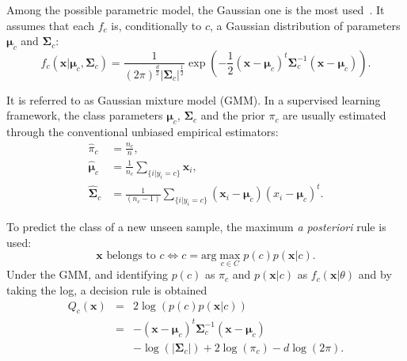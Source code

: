 \documentclass[journal,peerreview,onecolumn]{IEEEtran}
\begin{document}
    Among the possible parametric model,  the Gaussian one is the most
    used~\cite{bouveyron2014model}.   It assumes  that each  $f_c$ is,
    conditionally  to  $c$,  a  Gaussian  distribution  of  parameters
    $\boldsymbol{\mu}_c$    and    $\boldsymbol{\Sigma}_c$:
    \begin{equation*}
        f_c(\mathbf{x}|\boldsymbol{\mu}_c, \boldsymbol{\Sigma}_c) = \frac{1}{(2\pi)^{\frac{d}{2}} |\boldsymbol{\Sigma}_c|^{\frac{1}{2}}} \exp \left( -\frac{1}{2} (\mathbf{x} - \boldsymbol{\mu}_c)^t \boldsymbol{\Sigma}_c^{-1} (\mathbf{x} - \boldsymbol{\mu}_c) \right).
    \end{equation*}

    It  is  referred  to  as  Gaussian  mixture  model  (GMM).   In  a
    supervised    learning    framework,    the    class    parameters
    $\boldsymbol{\mu}_c$,   $\boldsymbol{\Sigma}_c$   and  the   prior
    $\pi_c$ are  usually estimated  through the  conventional unbiased
    empirical estimators:
    \begin{align}
        \hat{\pi}_c &= \frac{n_c}{n},\\
        \hat{\boldsymbol{\mu}}_c &= \frac{1}{n_c} \sum_{\{i|y_i = c\}} \mathbf{x}_i ,\\
        \hat{\boldsymbol{\Sigma}}_c &= \frac{1}{(n_c - 1)} \sum_{\{i|y_i = c\}} (\mathbf{x}_i - \boldsymbol{\mu}_c) (\boldsymbol{}x_i - \boldsymbol{\mu}_c)^t.
    \end{align}

    To predict the  class of a new unseen sample,  the maximum \emph{a
      posteriori}  rule  is  used:
    \begin{equation*}
        \mathbf{x} \text{ belongs to } c \Leftrightarrow c = \text{arg} \max_{c \in C} p(c) p(\mathbf{x}|c).
    \end{equation*}
    Under the GMM,  and identifying $p(c)$ as $\pi_c$  and $p(\mathbf{x}|c)$ as
    $f_c(\mathbf{x}|\theta)$ and by taking the log, a decision rule is obtained
    \begin{eqnarray}\label{eq:decision}
      Q_c(\mathbf{x}) &=& 2 \log \left( p(c) p(\mathbf{x}|c) \right) \nonumber \\
                      &=& - (\mathbf{x} - \boldsymbol{\mu}_c)^t \boldsymbol{\Sigma}_c^{-1} (\mathbf{x} - \boldsymbol{\mu}_c) \nonumber \\
                      & &-\log (|\boldsymbol{\Sigma}_c|) + 2 \log (\pi_c) - d \log (2\pi).
    \end{eqnarray}
\end{document}
